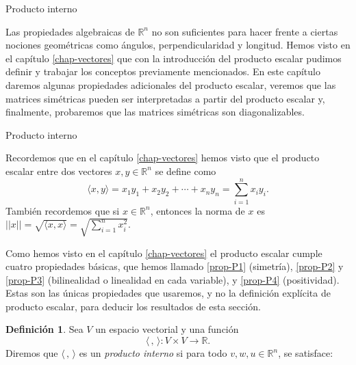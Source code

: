 \documentclass[a4paper,12pt,twoside,spanish,reqno]{amsbook}
\numberwithin{equation}{section}
\theoremstyle{definition}
\newtheorem{definicion}[teorema]{Definici\'on}
\theoremstyle{remark}
\newcommand{\la}{\langle}
\newcommand{\ra}{\rangle}
\newcommand{\R}{\mathbb R}
\begin{document}
    \begin{chapter}{Producto interno}\label{chap-esp-prod-int}
    

    Las propiedades algebraicas de $\R^n$ no son suficientes para hacer frente a ciertas nociones geométricas  como  ángulos, perpendicularidad y longitud. Hemos visto en el  capítulo \ref{chap-vectores} que con la introducción del producto escalar pudimos definir y  trabajar  los conceptos previamente mencionados. En  este capítulo daremos algunas propiedades adicionales del producto escalar, veremos que las matrices simétricas pueden ser interpretadas a partir del producto escalar y, finalmente, probaremos que las matrices simétricas son diagonalizables.
    
    
    \begin{section}{Producto interno}\label{seccion-producto-interno}
        
        
        \medskip 
        
        Recordemos que en
         el  capítulo \ref{chap-vectores} hemos visto que el producto escalar entre dos vectores $x,y \in \R^n$ se define como
        \begin{equation*}
            \la x,y\ra = x_1y_1 + x_2y_2+\cdots+x_ny_n = \sum_{i=1}^{n} x_iy_i.
        \end{equation*}
        También recordemos que si  $x \in \R^n$,  entonces la norma de $x$ es $||x|| = \sqrt{\la x,x\ra} = \sqrt{ \sum_{i=1}^{n} x_i^2}$.
        
        Como hemos visto en  el capítulo \ref{chap-vectores} el producto escalar  cumple cuatro propiedades básicas,  que hemos llamado \ref{prop-P1} (simetría), \ref{prop-P2} y \ref{prop-P3} (bilinealidad o linealidad en cada variable), y \ref{prop-P4} (positividad). Estas son las únicas propiedades que usaremos, y no la definición explícita de producto escalar,  para deducir los resultados de esta sección. 
        
        \begin{definicion} Sea $V$  un espacio  vectorial y  una función
            \begin{equation*}
            \la \,,\,\ra: V \times V \to \R .
            \end{equation*}
            Diremos que $\la \,,\,\ra$ es un \textit{producto interno} si para todo $v, w, u \in \R^n$, se satisface:
            

\end{definicion}
\end{section}
\end{chapter}
\end{document}
